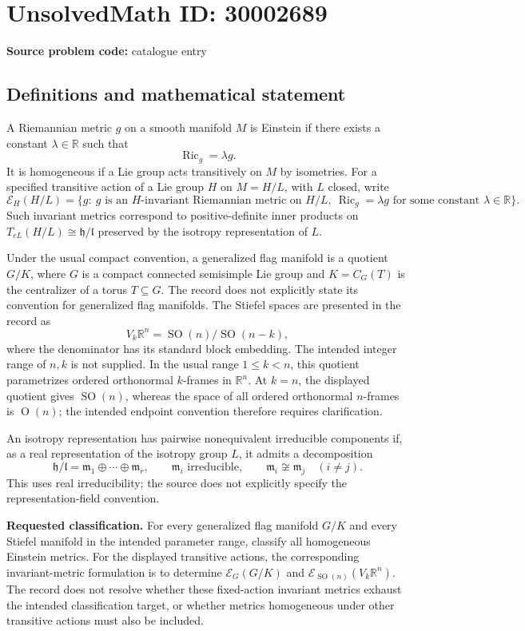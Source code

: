 \documentclass[11pt]{article}
\newcommand{\R}{\mathbb{R}}
\begin{document}
\section*{UnsolvedMath ID: 30002689}
\textbf{Source problem code:} catalogue entry
\subsection{Definitions and mathematical statement}
A Riemannian metric \(g\) on a smooth manifold \(M\) is Einstein if there exists a constant \(\lambda\in\R\) such that
\[
\operatorname{Ric}_g=\lambda g.
\]
It is homogeneous if a Lie group acts transitively on \(M\) by isometries. For a specified transitive action of a Lie group \(H\) on \(M=H/L\), with \(L\) closed, write
\[
\mathcal E_H(H/L)=\{g:\ g\text{ is an }H\text{-invariant Riemannian metric on }H/L,\ \operatorname{Ric}_g=\lambda g\text{ for some constant }\lambda\in\R\}.
\]
Such invariant metrics correspond to positive-definite inner products on \(T_{eL}(H/L)\cong\mathfrak h/\mathfrak l\) preserved by the isotropy representation of \(L\).

Under the usual compact convention, a generalized flag manifold is a quotient \(G/K\), where \(G\) is a compact connected semisimple Lie group and \(K=C_G(T)\) is the centralizer of a torus \(T\subseteq G\). The record does not explicitly state its convention for generalized flag manifolds. The Stiefel spaces are presented in the record as
\[
V_k\R^n=\operatorname{SO}(n)/\operatorname{SO}(n-k),
\]
where the denominator has its standard block embedding. The intended integer range of \(n,k\) is not supplied. In the usual range \(1\leq k<n\), this quotient parametrizes ordered orthonormal \(k\)-frames in \(\R^n\). At \(k=n\), the displayed quotient gives \(\operatorname{SO}(n)\), whereas the space of all ordered orthonormal \(n\)-frames is \(\operatorname{O}(n)\); the intended endpoint convention therefore requires clarification.

An isotropy representation has pairwise nonequivalent irreducible components if, as a real representation of the isotropy group \(L\), it admits a decomposition
\[
\mathfrak h/\mathfrak l=\mathfrak m_1\oplus\cdots\oplus\mathfrak m_r,
\qquad
\mathfrak m_i\text{ irreducible},\qquad
\mathfrak m_i\not\cong\mathfrak m_j\quad(i\ne j).
\]
This uses real irreducibility; the source does not explicitly specify the representation-field convention.

\textbf{Requested classification.} For every generalized flag manifold \(G/K\) and every Stiefel manifold in the intended parameter range, classify all homogeneous Einstein metrics. For the displayed transitive actions, the corresponding invariant-metric formulation is to determine \(\mathcal E_G(G/K)\) and \(\mathcal E_{\operatorname{SO}(n)}(V_k\R^n)\). The record does not resolve whether these fixed-action invariant metrics exhaust the intended classification target, or whether metrics homogeneous under other transitive actions must also be included.
\end{document}
